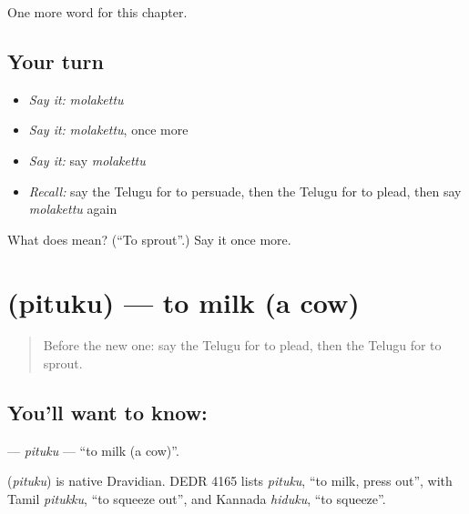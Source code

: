 \begin{grammarlens}[title={What you've built}]
One more word for this chapter.
\end{grammarlens}

\subsection*{Your turn}
\begin{itemize}
\raggedright
  \item \emph{Say it:} \emph{molakettu}
  \item \emph{Say it:} \emph{molakettu}, once more
  \item \emph{Say it:} say \emph{molakettu}
  \item \emph{Recall:} say the Telugu for to persuade, then the Telugu for to plead, then say \emph{molakettu} again
\end{itemize}

\begin{tcolorbox}[breakable,colback=teal!4,colframe=teal!35!black,title={Before you move on}]
What does  mean? (\textquotedblleft{}To sprout\textquotedblright{}.) Say it once more.
\end{tcolorbox}
\section[\texorpdfstring{\te{పితుకు} (pituku)}{పితుకు (pituku)}]{ (pituku) — to milk (a cow)}

\label{lesson:TE-C248-pituku}



\begin{quote}
Before the new one: say the Telugu for to plead, then the Telugu for to sprout.
\end{quote}

\subsection*{You'll want to know: }
\textbf{} — \emph{pituku} — \textquotedblleft{}to milk (a cow)\textquotedblright{}.

\begin{cousinweb}
\textbf{} (\emph{pituku}) is native Dravidian. DEDR 4165 lists \emph{pituku}, \textquotedblleft{}to milk, press out\textquotedblright{}, with Tamil \emph{pitukku}, \textquotedblleft{}to squeeze out\textquotedblright{}, and Kannada \emph{hiduku}, \textquotedblleft{}to squeeze\textquotedblright{}.
\end{cousinweb}

